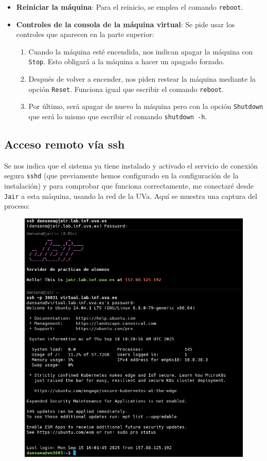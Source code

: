 \documentclass[10pt]{article}
\begin{document}
\begin{itemize}
		\item \textbf{Reiniciar la máquina}: Para el reinicio, se emplea el comando \verb|reboot|.
		\item \textbf{Controles de la consola de la máquina virtual}: Se pide usar los controles que aparecen en la parte superior:
		\begin{enumerate}
			\item Cuando la máquina esté encendida, nos indican apagar la máquina con \verb|Stop|. Esto obligará a la máquina a hacer un apagado forzado.
			\item Después de volver a encender, nos piden restear la máquina mediante la opción \verb|Reset|. Funciona igual que escribir el comando \verb|reboot|.
			\item Por último, será apagar de nuevo la máquina pero con la opción \verb|Shutdown| que será lo mismo que escribir el comando \verb|shutdown -h|.
		\end{enumerate}
	\end{itemize}
	
	\subsection{Acceso remoto vía ssh}
	Se nos indica que el sistema ya tiene instalado y activado el servicio de conexión segura \verb|sshd| (que previamente hemos configurado en la configuración de la instalación) y para comprobar que funciona correctamente, me conectaré desde \verb|Jair| a esta máquina, usando la red de la UVa. Aquí se muestra una captura del proceso:
	\begin{figure}[H]
		\setlength{\abovecaptionskip}{0cm}
		\setlength{\belowcaptionskip}{0cm}
		\centering
		\includegraphics[width=0.6\linewidth]{Recursos/ssh.png}
		\label{fig:datos}
	\end{figure}
	
\end{document}
